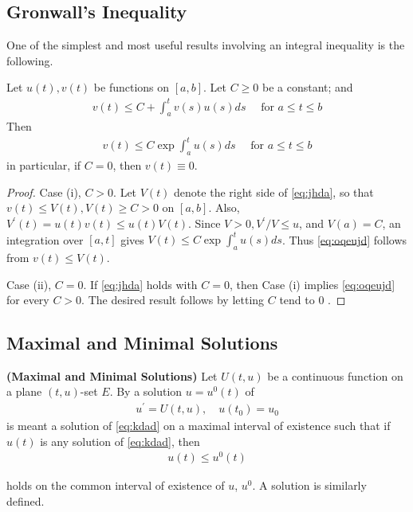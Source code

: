 \documentclass{article}
\newcommand{\bfs}[1]{\textbf{({#1}) }}
\begin{document}
\subsection{Gronwall's Inequality}
One of the simplest and most useful results involving an integral inequality is the following.

\begin{thma}\label{thm:jdadffr}
Let $u(t), v(t)$ be  functions on $[a, b]$. Let $C \ge 0$ be a constant; and
\begin{align}
v(t)\le C+\int_{a}^{t} v(s) u(s) d s \quad \text { for } a\le t\le b\label{eq:jhda}
\end{align}
Then
\begin{align}
v(t)\le C \exp \int_{a}^{t} u(s) d s \quad \text { for } a\le t\le b\label{eq:oqeujd}
\end{align}
in particular, if $C=0$, then $v(t) \equiv 0$.
\end{thma} 
\begin{proof}
Case (i), $C>0$. Let $V(t)$ denote the right side of \cref{eq:jhda}, so that $v(t)\le V(t), V(t) \ge C>0$ on $[a, b]$. Also, $V^{\prime}(t)=u(t) v(t)\le u(t) V(t)$. Since $V>0, V^{\prime}/V\le u$, and $V(a)=C$, an integration over $[a, t]$ gives $V(t)\le C \exp \int_{a}^{t} u(s) d s$. Thus \cref{eq:oqeujd} follows from $v(t)\le V(t)$.

Case (ii), $C=0$. If \cref{eq:jhda} holds with $C=0$, then Case (i) implies \cref{eq:oqeujd} for every $C>0$. The desired result follows by letting $C$ tend to 0 .

\end{proof}

\subsection{Maximal and Minimal Solutions}

\begin{defa}\bfs{Maximal and Minimal Solutions}
Let $U(t, u)$ be a continuous function on a plane $(t, u)$-set $E$. By a  solution $u=u^{0}(t)$ of
\begin{align}
u^{\prime}=U(t, u), \quad u\left(t_{0}\right)=u_{0}\label{eq:kdad}
\end{align}
is meant a solution of \cref{eq:kdad} on a maximal interval of existence such that if $u(t)$ is any solution of \cref{eq:kdad}, then
\begin{align}
u(t)\le u^{0}(t)\label{eq:kdjnz}
\end{align}
\end{defa}
holds on the common interval of existence of $u$, $u^{0}$. A  solution is similarly defined.
\end{document}

